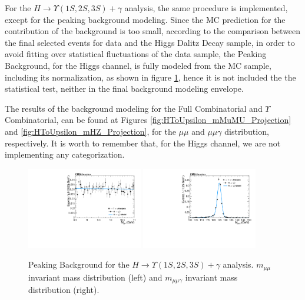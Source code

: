 For the $H \rightarrow \Upsilon(1S,2S,3S) + \gamma$ analysis, the same procedure is implemented, except for the peaking background modeling. Since the MC prediction for the contribution of the background is too small, according to the comparison between the final selected events for data and the Higgs Dalitz Decay sample, in order to avoid fitting over statistical fluctuations of the data sample, the Peaking Background, for the Higgs channel, is fully modeled from the MC sample, including its normalization, as shown in figure \ref{fig:HToUpsilon_PeakingBackground}, hence it is not included the the statistical test, neither in the final background modeling envelope.

The results of the background modeling for the Full Combinatorial and $\Upsilon$ Combinatorial, can be found at Figures \ref{fig:HToUpsilon_mMuMU_Projection} and \ref{fig:HToUpsilon_mHZ_Projection}, for the $\mu\mu$ and $\mu\mu\gamma$ distribution, respectively. It is worth to remember that, for the Higgs channel, we are not implementing any categorization.


\begin{figure}[!htbp]
\begin{center}
\includegraphics[width=0.45\textwidth]{figures_and_tables/fitPlotFiles2D/HToUpsilonPhotonSignalAndBackgroundFit/mMuMNU_HToUpsilon1SPhotonSignalAndBackgroundFit_PeakingBackground_Cat0}\hspace*{1.cm}
\includegraphics[width=0.45\textwidth]{figures_and_tables/fitPlotFiles2D/HToUpsilonPhotonSignalAndBackgroundFit/mHZ_HToUpsilon1SPhotonSignalAndBackgroundFit_PeakingBackground_Cat0}\hspace*{1.cm}
\end{center}\vspace*{-.5cm}
\caption{Peaking Background for the $H \rightarrow \Upsilon(1S,2S,3S) +\gamma$ analysis. $m_{\mu\mu}$ invariant mass distribution (left) and $m_{\mu\mu\gamma}$ invariant mass distribution (right).}
\label{fig:HToUpsilon_PeakingBackground}
\end{figure}


